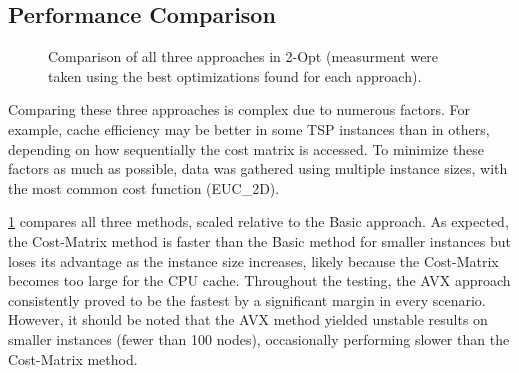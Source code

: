 \subsection{Performance Comparison}

\begin{figure}[htbp]
    \centering
    \caption{Comparison of all three approaches in 2-Opt (measurment were taken using the best optimizations found for each approach).} \label{fig:avxShowcase}
\end{figure}

Comparing these three approaches is complex due to numerous factors.
For example, cache efficiency may be better in some TSP instances than in others, depending on how sequentially the cost matrix is accessed.
To minimize these factors as much as possible, data was gathered using multiple instance sizes, with the most common cost function (EUC\_2D).

\figurename{ \ref{fig:avxShowcase}} compares all three methods, scaled relative to the Basic approach.
As expected, the Cost-Matrix method is faster than the Basic method for smaller instances but loses its advantage as the instance size increases, likely because the Cost-Matrix becomes too large for the CPU cache.
Throughout the testing, the AVX approach consistently proved to be the fastest by a significant margin in every scenario.
However, it should be noted that the AVX method yielded unstable results on smaller instances (fewer than 100 nodes), occasionally performing slower than the Cost-Matrix method.


